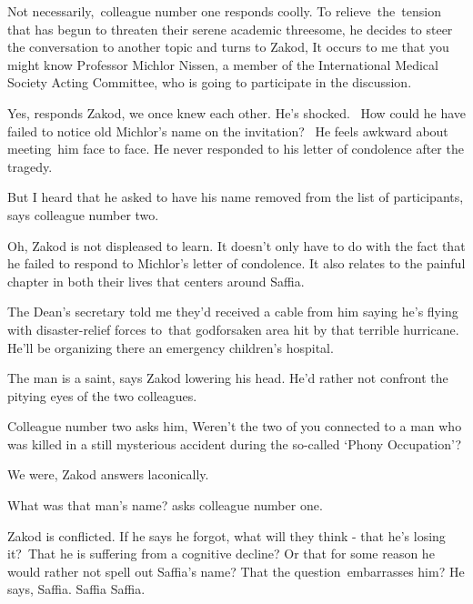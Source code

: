 \documentclass[letterpaper]{article}
\begin{document}
{\textquotedbl}Not necessarily,{\textquotedbl}\ colleague number one responds coolly. To relieve~the~tension that has
begun to threaten their serene academic threesome, he decides to steer the conversation to another topic and turns to
Zakod, {\textquotedbl}It occurs to me that you might know Professor Michlor Nissen, a member of the International
Medical Society Acting Committee, who is going to participate in the discussion.{\textquotedbl} 

{\textquotedbl}Yes,{\textquotedbl} responds Zakod, {\textquotedbl}we once knew each other.{\textquotedbl} He's shocked.
~How could he have failed to notice old Michlor's name on the invitation? ~He feels awkward about meeting\  him face to
face. He never responded to his letter of condolence after the tragedy.\ \ 

{\textquotedbl}But I heard that he asked to have his name removed from the list of participants,{\textquotedbl} says
colleague number two. 

{\textquotedbl}Oh,{\textquotedbl} Zakod is not displeased to learn. It doesn't only have to do with the fact that he
failed to respond to Michlor's letter of condolence. It also relates to the painful chapter in both their lives that
centers around Saffia.

{\textquotedbl}The Dean's secretary told me they'd received a cable from him saying he's flying with disaster-relief
forces to\textcolor{red}{\ }that godforsaken area hit by that terrible hurricane. He'll be organizing there an
emergency children's hospital.{\textquotedbl} 

{\textquotedbl}The man is a saint,{\textquotedbl} says Zakod lowering his head. He'd rather not confront the pitying
eyes of the two colleagues. 

Colleague number two asks him, {\textquotedbl}Weren't the two of you connected to a man who was killed in a still
mysterious accident during the so-called `Phony Occupation'?{\textquotedbl} 

{\textquotedbl}We were,{\textquotedbl} Zakod answers laconically. 

{\textquotedbl}What was that man's name?{\textquotedbl} asks colleague number one.

Zakod is conflicted. If he says he forgot, what will they think - that he's losing it?\textcolor{red}{\ }That he is
suffering from a cognitive decline? Or that for some reason he would rather not spell out Saffia's name? That the
question~embarrasses him? He says, {\textquotedbl}Saffia. Saffia Saffia.{\textquotedbl} 
\end{document}
